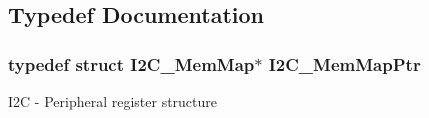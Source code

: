 \subsection{Typedef Documentation}
\hypertarget{group___i2_c___peripheral_ga9902bc02a12982d0c37ec011b4dd89f0}{}
\subsubsection[{I2\+C\+\_\+\+Mem\+Map\+Ptr}]{\setlength{\rightskip}{0pt plus 5cm}typedef struct {\bf I2\+C\+\_\+\+Mem\+Map}$\ast$ {\bf I2\+C\+\_\+\+Mem\+Map\+Ptr}}\label{group___i2_c___peripheral_ga9902bc02a12982d0c37ec011b4dd89f0}
I2\+C -\/ Peripheral register structure 
